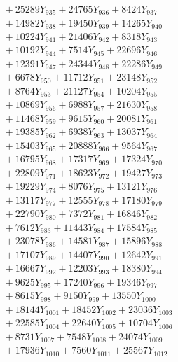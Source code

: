 \documentclass[a4paper,10pt]{article}
\begin{document}
{\begin{align}
&\;  + 25289 Y_{935} + 24765 Y_{936} + 8424 Y_{937} \\[0.3ex]
&\;  + 14982 Y_{938} + 19450 Y_{939} + 14265 Y_{940} \\[0.3ex]
&\;  + 10224 Y_{941} + 21406 Y_{942} + 8318 Y_{943} \\[0.3ex]
&\;  + 10192 Y_{944} + 7514 Y_{945} + 22696 Y_{946} \\[0.3ex]
&\;  + 12391 Y_{947} + 24344 Y_{948} + 22286 Y_{949} \\[0.3ex]
&\;  + 6678 Y_{950} + 11712 Y_{951} + 23148 Y_{952} \\[0.3ex]
&\;  + 8764 Y_{953} + 21127 Y_{954} + 10204 Y_{955} \\[0.3ex]
&\;  + 10869 Y_{956} + 6988 Y_{957} + 21630 Y_{958} \\[0.5ex]\allowbreak
&\;  + 11468 Y_{959} + 9615 Y_{960} + 20081 Y_{961} \\[0.3ex]
&\;  + 19385 Y_{962} + 6938 Y_{963} + 13037 Y_{964} \\[0.3ex]
&\;  + 15403 Y_{965} + 20888 Y_{966} + 9564 Y_{967} \\[0.3ex]
&\;  + 16795 Y_{968} + 17317 Y_{969} + 17324 Y_{970} \\[0.3ex]
&\;  + 22809 Y_{971} + 18623 Y_{972} + 19427 Y_{973} \\[0.3ex]
&\;  + 19229 Y_{974} + 8076 Y_{975} + 13121 Y_{976} \\[0.3ex]
&\;  + 13117 Y_{977} + 12555 Y_{978} + 17180 Y_{979} \\[0.3ex]
&\;  + 22790 Y_{980} + 7372 Y_{981} + 16846 Y_{982} \\[0.3ex]
&\;  + 7612 Y_{983} + 11443 Y_{984} + 17584 Y_{985} \\[0.3ex]
&\;  + 23078 Y_{986} + 14581 Y_{987} + 15896 Y_{988} \\[0.5ex]\allowbreak
&\;  + 17107 Y_{989} + 14407 Y_{990} + 12642 Y_{991} \\[0.3ex]
&\;  + 16667 Y_{992} + 12203 Y_{993} + 18380 Y_{994} \\[0.3ex]
&\;  + 9625 Y_{995} + 17240 Y_{996} + 19346 Y_{997} \\[0.3ex]
&\;  + 8615 Y_{998} + 9150 Y_{999} + 13550 Y_{1000} \\[0.3ex]
&\;  + 18144 Y_{1001} + 18452 Y_{1002} + 23036 Y_{1003} \\[0.3ex]
&\;  + 22585 Y_{1004} + 22640 Y_{1005} + 10704 Y_{1006} \\[0.3ex]
&\;  + 8731 Y_{1007} + 7548 Y_{1008} + 24074 Y_{1009} \\[0.3ex]
&\;  + 17936 Y_{1010} + 7560 Y_{1011} + 25567 Y_{1012} \\[0.3ex]

\end{align}}
\end{document}
